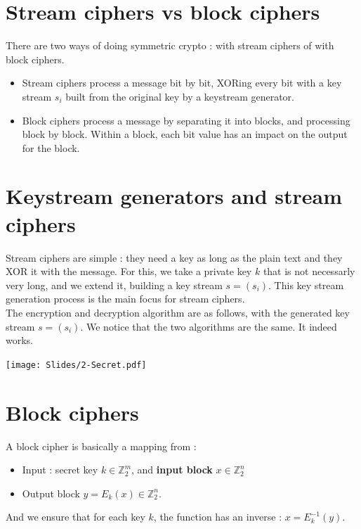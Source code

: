 \documentclass[../Cryptography.tex]{subfiles}
\begin{document}
\section{Stream ciphers vs block ciphers}
There are two ways of doing symmetric crypto : with stream ciphers of with block ciphers. \\

\begin{itemize}
    \item Stream ciphers process a message bit by bit, XORing every bit with a key stream $s_i$ built from the original key by a keystream generator.
    \item Block ciphers process a message by separating it into blocks, and processing block by block. Within a block, each bit value has an impact on the output for the block.
\end{itemize}

\section{Keystream generators and stream ciphers}
Stream ciphers are simple : they need a key as long as the plain text and they XOR it with the message. For this, we take a private key $k$ that is not necessarly very long, and we extend it, building a key stream $s = (s_i)$. This key stream generation process is the main focus for stream ciphers. \\

The encryption and decryption algorithm are as follows, with the generated key stream $s=(s_i)$. We notice that the two algorithms are the same. It indeed works.

\begin{center}
    \texttt{[image: Slides/2-Secret.pdf]}
\end{center}


\section{Block ciphers}
A block cipher is basically a mapping from :
\begin{itemize}
    \item Input : secret key $k\in \mathbb{Z}_2 ^m$, and \textbf{input block} $x \in \mathbb{Z}_2 ^n$
    \item Output block $y = E_k(x) \in \mathbb{Z}_2 ^n$.
\end{itemize}
And we ensure that for each key $k$, the function has an inverse : $x = E_k ^{-1}(y)$. \\
\end{document}
